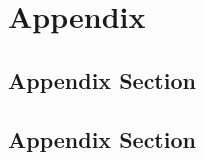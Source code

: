 \documentclass[runningheads]{llncs}
\begin{document}










\newpage




\appendix
\section{Appendix}
\label{sec:appendix}

\subsection{Appendix Section}
\label{sec:appendix-section}

\subsection{Appendix Section}
\label{sec:appendix-section-2}
\end{document}
